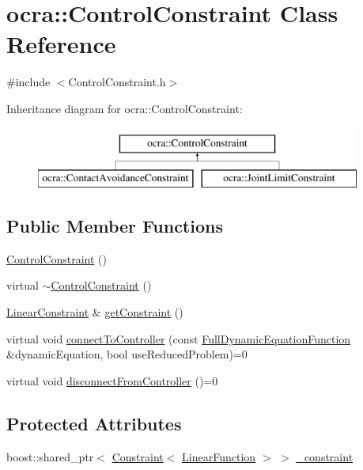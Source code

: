 \hypertarget{classocra_1_1ControlConstraint}{}\section{ocra\+:\+:Control\+Constraint Class Reference}
\label{classocra_1_1ControlConstraint}


{\ttfamily \#include $<$Control\+Constraint.\+h$>$}

Inheritance diagram for ocra\+:\+:Control\+Constraint\+:\begin{figure}[H]
\begin{center}
\leavevmode
\includegraphics[height=2.000000cm]{d7/d85/classocra_1_1ControlConstraint}
\end{center}
\end{figure}
\subsection*{Public Member Functions}
\begin{DoxyCompactItemize}
\item 
\hyperlink{classocra_1_1ControlConstraint_a3d911f350d6a51009b670dcf061ab93e}{Control\+Constraint} ()
\item 
virtual \hyperlink{classocra_1_1ControlConstraint_a49f1eb50f143ef0e438d3af43db9eb31}{$\sim$\+Control\+Constraint} ()
\item 
\hyperlink{namespaceocra_ae8b87cf4099be3efc3b410019ad2046e}{Linear\+Constraint} \& \hyperlink{classocra_1_1ControlConstraint_a41b7568bc59441ca8d115e7ccf613658}{get\+Constraint} ()
\item 
virtual void \hyperlink{classocra_1_1ControlConstraint_a04dabdc1c469146e7b3240dfe0a5172c}{connect\+To\+Controller} (const \hyperlink{classocra_1_1FullDynamicEquationFunction}{Full\+Dynamic\+Equation\+Function} \&dynamic\+Equation, bool use\+Reduced\+Problem)=0
\item 
virtual void \hyperlink{classocra_1_1ControlConstraint_adbd15b36773c775a06a0b7bde46ec799}{disconnect\+From\+Controller} ()=0
\end{DoxyCompactItemize}
\subsection*{Protected Attributes}
\begin{DoxyCompactItemize}
\item 
boost\+::shared\+\_\+ptr$<$ \hyperlink{classocra_1_1Constraint}{Constraint}$<$ \hyperlink{classocra_1_1LinearFunction}{Linear\+Function} $>$ $>$ \hyperlink{classocra_1_1ControlConstraint_a47cebded91be870b03e1dddc7b0c215b}{\+\_\+constraint}
\end{DoxyCompactItemize}
